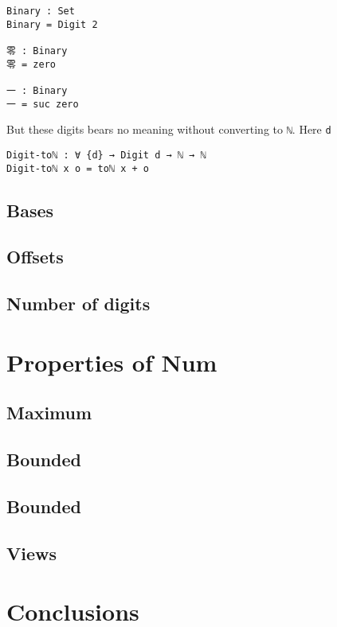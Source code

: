\documentclass[12pt, a4paper]{article}
\begin{document}
\begin{lstlisting}
Binary : Set
Binary = Digit 2

零 : Binary
零 = zero

一 : Binary
一 = suc zero
\end{lstlisting}

But these digits bears no meaning without converting to {\lstinline|ℕ|}.
Here {\lstinline|d|}

\begin{lstlisting}
Digit-toℕ : ∀ {d} → Digit d → ℕ → ℕ
Digit-toℕ x o = toℕ x + o
\end{lstlisting}


%





\subsection{Bases}
\subsection{Offsets}
\subsection{Number of digits}

\section{Properties of Num}
\subsection{Maximum}
\subsection{Bounded}
\subsection{Bounded}
\subsection{Views}

\section{Conclusions}\label{conclusions}



\end{document}
